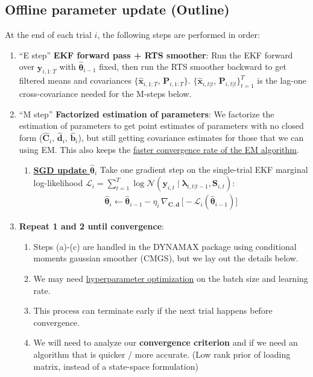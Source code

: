 \documentclass[11pt,letterpaper]{article} %
\begin{document}
\clearpage
\subsection*{Offline parameter update (Outline)}
At the end of each trial $i$, the following steps are performed in order:
\begin{enumerate}
    \item ``E step'' \textbf{EKF forward pass + RTS smoother}:
    Run the EKF forward over $\bm{y}_{i,1:T}$ with $\hat{\bm{\theta}}_{i-1}$ fixed, then run the RTS smoother backward to get filtered means and covariances $\{\hat{\bm{x}}_{i,1:T},\, \bm{P}_{i,1:T}\}$. $\{\hat{\bm{x}}_{i,t|t},\, \bm{P}_{i,t|t}\}_{t=1}^{T}$ is the lag-one cross-covariance needed for the M-steps below.
    \item ``M step'' \textbf{Factorized estimation of parameters}: \label{sec:factorized_estimation} We factorize the estimation of parameters to get point estimates of parameters with no closed form ($\hat{\bm{C}}_i$, $\hat{\bm{d}}_i$, $\hat{\bm{b}}_i$), but still getting covariance estimates for those that we can using EM. This also keeps the \href{https://probml.github.io/dynamax/notebooks/hmm/casino_hmm_learning.html#compare-the-learning-algorithms}{faster convergence rate of the EM algorithm}.
    \begin{enumerate}
        \item \hyperref[sec:sgd_parameter_update]{\textbf{SGD update $\hat{\bm{\theta}}_i$}}
            Take one gradient step on the single-trial EKF marginal log-likelihood
            $\mathcal{L}_i = \sum_{t=1}^{T} \log\mathcal{N}(\bm{y}_{i,t} \mid
            \boldsymbol{\lambda}_{i,t|t-1}, \bm{S}_{i,t})$:
            \begin{align*}
                \hat{\bm{\theta}}_i \leftarrow \hat{\bm{\theta}}_{i-1} - \eta_i\, \nabla_{\bm{C},\bm{d}}\,
                    \bigl[-\mathcal{L}_i(\hat{\boldsymbol{\theta}}_{i-1})\bigr]
            \end{align*}
    \end{enumerate}
    \item \textbf{Repeat 1 and 2 until convergence}:
    \begin{enumerate}
        \item Steps (a)-(c) are handled in the DYNAMAX package using conditional moments gaussian smoother (CMGS), but we lay out the details below.
        \item We may need \href{https://probml.github.io/dynamax/notebooks/hmm/casino_hmm_learning.html#hyperparameter-tuning}{hyperparameter optimization} on the batch size and learning rate.
        \item This process can terminate early if the next trial happens before convergence.
        \item We will need to analyze our \textbf{convergence criterion}\label{sec:convergence_criterion} and if we need an algorithm that is quicker / more accurate. (Low rank prior of loading matrix, instead of a state-space formulation) %
    \end{enumerate}
\end{enumerate}
\vspace{0.2cm}
\end{document}
